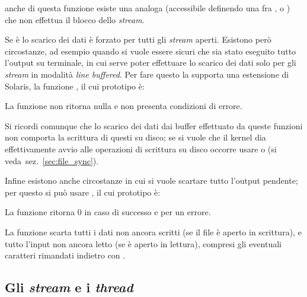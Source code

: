 \noindent anche di questa funzione esiste una analoga 
(accessibile definendo una fra ,  o
) che non effettua il blocco dello \textit{stream}.


Se  è  lo scarico dei dati è forzato per tutti gli
\textit{stream} aperti. Esistono però circostanze, ad esempio quando si vuole
essere sicuri che sia stato eseguito tutto l'output su terminale, in cui serve
poter effettuare lo scarico dei dati solo per gli \textit{stream} in modalità
\textit{line buffered}. Per fare questo la  supporta una
estensione di Solaris, la funzione , il cui prototipo è:

\begin{funcproto}{
}

{La funzione non ritorna nulla e non presenta condizioni di errore.}  
\end{funcproto}

Si ricordi comunque che lo scarico dei dati dai buffer effettuato da queste
funzioni non comporta la scrittura di questi su disco; se si vuole che il
kernel dia effettivamente avvio alle operazioni di scrittura su disco occorre
usare  o  (si veda~sez.~\ref{sec:file_sync}).

Infine esistono anche circostanze in cui si vuole scartare tutto l'output
pendente; per questo si può usare , il cui prototipo è:

\begin{funcproto}{
}

{La funzione ritorna $0$ in caso di successo e  per un errore.}  
\end{funcproto}

La funzione scarta tutti i dati non ancora scritti (se il file è aperto in
scrittura), e tutto l'input non ancora letto (se è aperto in lettura),
compresi gli eventuali caratteri rimandati indietro con .


\subsection{Gli \textit{stream} e i \textit{thread}}
\label{sec:file_stream_thread}


